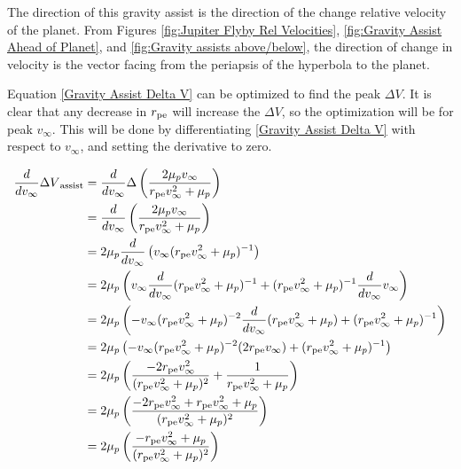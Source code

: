\documentclass[../basicOrbitalDynamics.tex]{subfiles}
\begin{document}
The direction of this gravity assist is the direction of the change relative velocity of the planet. From Figures \ref{fig:Jupiter Flyby Rel Velocities}, \ref{fig:Gravity Assist Ahead of Planet}, and \ref{fig:Gravity assists above/below}, the direction of change in velocity is the vector facing from the periapsis of the hyperbola to the planet.

Equation \eqref{Gravity Assist Delta V} can be optimized to find the peak $\Delta V$. It is clear that any decrease in ${r}_\text{pe}$ will increase the $\Delta V$, so the optimization will be for peak $v_\infty$. This will be done by differentiating \eqref{Gravity Assist Delta V} with respect to $v_\infty$, and setting the derivative to zero.

\begin{align*}
    \frac{d}{dv_\infty}{\Delta V}_\text{assist} & =\frac{d}{dv_\infty}\Delta\left(\frac{2\mu_p v_\infty}{{r}_\text{pe}v_\infty^2+\mu_p}\right)                                                         \\
                                              & =\frac{d}{dv_\infty}\left(\frac{2\mu_p v_\infty}{{r}_\text{pe}v_\infty^2+\mu_p}\right)                                                               \\
                                              & =2\mu_p\frac{d}{dv_\infty}\left(v_\infty({r}_\text{pe}v_\infty^2+\mu_p)^{-1}\right)                                                                  \\
                                              & =2\mu_p\left(v_\infty\frac{d}{dv_\infty}({r}_\text{pe}v_\infty^2+\mu_p)^{-1}+({r}_\text{pe}v_\infty^2+\mu_p)^{-1}\frac{d}{dv_\infty}v_\infty\right)    \\
                                              & =2\mu_p\left(-v_\infty({r}_\text{pe}v_\infty^2+\mu_p)^{-2}\frac{d}{dv_\infty}({r}_\text{pe}v_\infty^2+\mu_p)+({r}_\text{pe}v_\infty^2+\mu_p)^{-1}\right) \\
                                              & =2\mu_p\left(-v_\infty({r}_\text{pe}v_\infty^2+\mu_p)^{-2}(2{r}_\text{pe}v_\infty)+({r}_\text{pe}v_\infty^2+\mu_p)^{-1}\right)                           \\
                                              & =2\mu_p\left(\frac{-2{r}_\text{pe}v_\infty^2}{({r}_\text{pe}v_\infty^2+\mu_p)^2}+\frac{1}{{r}_\text{pe}v_\infty^2+\mu_p}\right)                          \\
                                              & =2\mu_p\left(\frac{-2{r}_\text{pe}v_\infty^2+{r}_\text{pe}v_\infty^2+\mu_p}{({r}_\text{pe}v_\infty^2+\mu_p)^2}\right)                                    \\
                                              & =2\mu_p\left(\frac{-{r}_\text{pe}v_\infty^2+\mu_p}{({r}_\text{pe}v_\infty^2+\mu_p)^2}\right)                                                           \\
\end{align*}
\end{document}
